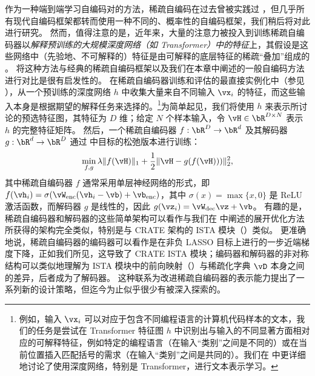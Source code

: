 \documentclass[../../book-main.tex]{subfiles}
\begin{document}

作为一种端到端学习自编码对的方法，稀疏自编码在过去曾被实践过 \cite{Ranzato2006-oq}，但几乎所有现代自编码框架都转而使用一种不同的、概率性的自编码框架，我们稍后将对此进行研究。
然而，值得注意的是，近年来，大量的注意力被投入到训练稀疏自编码器以\textit{解释预训练的大规模深度网络（如 Transformer）中的特征}上，其假设是这些网络中（先验地、不可解释的）特征是由可解释的底层特征的稀疏“叠加”组成的 \cite{elhage2022superposition}。
将这种方法与经典的稀疏自编码框架以及我们在本章中阐述的一般自编码方法进行对比是很有启发性的。
在稀疏自编码器训练和评估的最直接实例化中（参见 \citep{huben2024sparse, gao2025scaling}），从一个预训练的深度网络 $h$ 中收集大量来自不同输入 $\vx_i$ 的特征，而这些输入本身是根据期望的解释任务来选择的。\footnote{例如，输入 $\vx_i$ 可以对应于包含不同编程语言的计算机代码样本的文本，我们的任务是尝试在 Transformer 特征图 $h$ 中识别出与输入的不同显著方面相对应的可解释特征，例如特定的编程语言（在输入“类别”之间是不同的）或在当前位置插入匹配括号的需求（在输入“类别”之间是共同的）。我们在  中更详细地讨论了使用深度网络，特别是 Transformer，进行文本表示学习。}为简单起见，我们将使用 $h$ 来表示所讨论的预选特征图，其特征为 $D$ 维；给定 $N$ 个样本输入，令 $\vH \in \bR^{D \times N}$ 表示 $h$ 的完整特征矩阵。
然后，一个稀疏自编码器 $f : \bR^D \to \bR^d$ 及其解码器 $g : \bR^d \to \bR^D$ 通过  中目标的松弛版本进行训练：
\begin{equation}\label{eq:sae-loss}
  \min_{f, g}
\lambda \|f(\vH)\|_1 + \frac{1}{2} \| \vH - g(f(\vH))) \|_2^2,
\end{equation}
其中稀疏自编码器 $f$ 通常采用单层神经网络的形式，即 $f(\vh_i) = \sigma(\vW_{\mathrm{enc}}(\vh_i - \vb) + \vb_{\mathrm{enc}})$，其中 $\sigma(x) = \max \{x, 0\}$ 是 ReLU 激活函数，而解码器 $g$ 是线性的，因此 $g(\vz_i) = \vW_{\mathrm{dec}}\vz + \vb$。
有趣的是，稀疏自编码器和解码器的这些简单架构可以看作与我们在  中阐述的展开优化方法所获得的架构完全类似，特别是与 CRATE 架构的 ISTA 模块（）类似。
更准确地说，稀疏自编码器的编码器可以看作是在非负 LASSO 目标上进行的一步近端梯度下降，正如我们所见，这导致了 CRATE ISTA 模块；编码器和解码器的非对称结构可以类似地理解为 ISTA 模块中的前向映射（）与稀疏化字典 $\vD$ 本身之间的差异，后者成为了解码器。
这种联系为改进稀疏自编码器的表示能力提出了一系列新的设计策略，但迄今为止似乎很少有被深入探索的。
\end{document}

